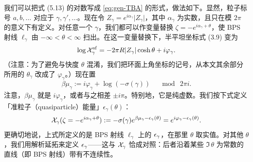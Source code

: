 我们可以把式 (5.13) 的对数写成 \eqref{eq:gen-TBA} 的形式，做法如下。显然，粒子标号 $a, b, \dots$ 对应于 $\gamma, \gamma', \dots$。现在令%
$Z_\gamma =
e^{i \alpha_\gamma} \vert Z_\gamma \vert$，其中 $\alpha_\gamma$ 为实数，且只在模 $2\pi$ 的意义下有定义。对任意一个 $\gamma$，我们都可以作变量替换 $\zeta = - e^{i \alpha_\gamma+ \theta}$，使 BPS 射线 $\ell_\gamma$ 由 $-\infty < \theta <
\infty$ 扫出。在这一变量替换下，半平坦坐标式 (3.9) 变为%
%
\begin{equation}
\log \mathcal{X}_{\gamma}^{{\mathrm{sf}}} = - 2 \pi R \lvert Z_\gamma \rvert \cosh \theta
+ i \varphi_\gamma.
\end{equation}
%
（注意：为了避免与快度 $\theta$ 混淆，我们把环面上角坐标的记号，从本文其余部分所用的 $\theta_\gamma$ 改成了 $\varphi_\gamma$。）现在置
%
\begin{equation}\label{eq:defmugamma}
\beta \mu_\gamma := i \varphi_\gamma + \log(-\sigma(\gamma))  \quad \mod \ 2
\pi i.
\end{equation}
%
注意，$\beta \mu_\gamma$ 就是 $i \varphi_\gamma$，或者与之相差 $\pm i \pi$。特别地，它是纯虚数。我们按下式定义「准粒子（quasiparticle）能量」$\epsilon_{\gamma}(\theta)$：
%
\begin{equation} \label{eq:qparticle}
\mathcal{X}_{\gamma}(\zeta = - e^{i \alpha_\gamma+ \theta}) :=
-\sigma(\gamma) e^{\beta \mu_\gamma - \epsilon_{\gamma}(\theta)}=
e^{i \varphi_\gamma - \epsilon_\gamma(\theta)}.
\end{equation}
%
更确切地说，上式所定义的是 BPS 射线 $\ell_\gamma$ 上的 $\epsilon_\gamma$，在那里 $\theta$ 取实值。对其他 $\theta$，我们用解析延拓来定义 $\epsilon_\gamma$——这与 $\mathcal{X}_\gamma$ 恰成对照：后者沿着某些 $\Im\,\theta$ 为常数的直线（即 BPS 射线）带有不连续性。

